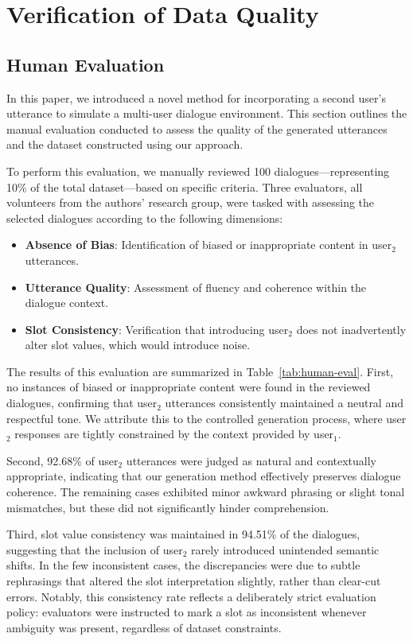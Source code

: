 \section{Verification of Data Quality}
\label{app:verify-data-quality}
\subsection{Human Evaluation}

In this paper, we introduced a novel method for incorporating a second user’s utterance to simulate a multi-user dialogue environment. This section outlines the manual evaluation conducted to assess the quality of the generated utterances and the dataset constructed using our approach.

To perform this evaluation, we manually reviewed 100 dialogues—representing 10\% of the total dataset—based on specific criteria. Three evaluators, all volunteers from the authors’ research group, were tasked with assessing the selected dialogues according to the following dimensions:

\begin{itemize}
\item \textbf{Absence of Bias}: Identification of biased or inappropriate content in user$_2$ utterances.
\item \textbf{Utterance Quality}: Assessment of fluency and coherence within the dialogue context.
\item \textbf{Slot Consistency}: Verification that introducing user$_2$ does not inadvertently alter slot values, which would introduce noise.
\end{itemize}

The results of this evaluation are summarized in Table~\ref{tab:human-eval}. First, no instances of biased or inappropriate content were found in the reviewed dialogues, confirming that user$_2$ utterances consistently maintained a neutral and respectful tone. We attribute this to the controlled generation process, where user$_2$ responses are tightly constrained by the context provided by user$_1$.

Second, 92.68\% of user$_2$ utterances were judged as natural and contextually appropriate, indicating that our generation method effectively preserves dialogue coherence. The remaining cases exhibited minor awkward phrasing or slight tonal mismatches, but these did not significantly hinder comprehension.

Third, slot value consistency was maintained in 94.51\% of the dialogues, suggesting that the inclusion of user$_2$ rarely introduced unintended semantic shifts. In the few inconsistent cases, the discrepancies were due to subtle rephrasings that altered the slot interpretation slightly, rather than clear-cut errors. Notably, this consistency rate reflects a deliberately strict evaluation policy: evaluators were instructed to mark a slot as inconsistent whenever ambiguity was present, regardless of dataset constraints.

